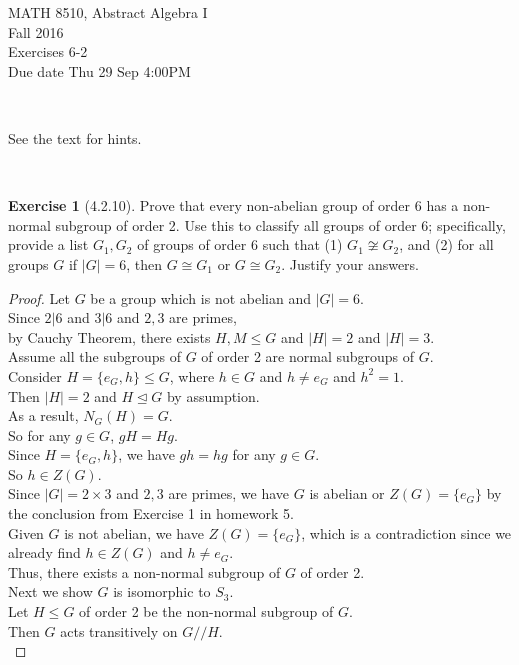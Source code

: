 \documentclass{amsart}
\theoremstyle{plain}
\theoremstyle{definition}
\newtheorem{exer}[lem]{Exercise}
\begin{document}
\noindent MATH 8510, Abstract Algebra I \\
Fall 2016\\
Exercises 6-2\\
Due date Thu 29 Sep 4:00PM

\

\noindent
See the text for hints.

\

%
%

\begin{exer}[4.2.10]
Prove that every non-abelian group of order 6 has a non-normal subgroup of order 2.
Use this to classify all groups of order 6;
specifically, provide a list $G_1,G_2$ of groups of order 6 such that (1) $G_1\not\cong G_2$, and (2) for all groups $G$ if $|G|=6$, then $G\cong G_1$ or $G\cong G_2$.
Justify your answers.
\begin{proof}
Let $G$ be a group which is not abelian and $|G| = 6$.\\
Since $2 | 6$ and $3 | 6$ and $2,3$ are primes, \\
by Cauchy Theorem, there exists $H, M \leq G$ and $|H| = 2$ and $|H| = 3$.\\
Assume all the subgroups of $G$ of order 2 are normal subgroups of $G$. \\
Consider $H=\{e_G,h\} \leq G$, where $h \in G$ and $h \neq e_G$ and $h^2 = 1$. \\
Then $|H| = 2$ and $H \unlhd G$ by assumption. \\
As a result, $N_G(H) = G$.\\
So for any $g \in G$, $gH = Hg$.\\
Since $H = \{e_G,h\}$, we have $gh = hg$ for any $g \in G$.\\
So $h \in Z(G)$.\\
Since $|G| = 2\times 3$ and $2,3$ are primes, we have $G$ is abelian or $Z(G)= \{e_G\}$ by the conclusion from Exercise 1 in homework 5.\\
Given $G$ is not abelian, we have $Z(G) = \{e_G\}$, which is a contradiction since we already find $h \in Z(G)$ and $h \neq e_G$.\\
Thus, there exists a non-normal subgroup of $G$ of order 2.\\
Next we show $G$ is isomorphic to $S_3$.\\
Let $H \leq G$ of order 2 be the non-normal subgroup of $G$.\\
Then $G$ acts transitively on $G//H$. \\

\end{proof}
\end{exer}
\end{document}
